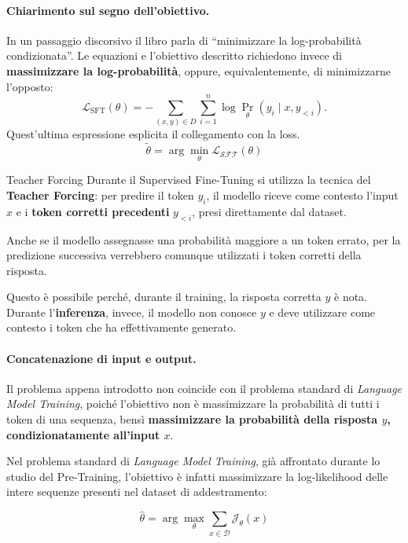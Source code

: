 \medskip




\paragraph{Chiarimento sul segno dell'obiettivo.}
In un passaggio discorsivo il libro parla di
``minimizzare la log-probabilità condizionata''.
Le equazioni e l'obiettivo descritto richiedono invece di
\textbf{massimizzare la log-probabilità}, oppure,
equivalentemente, di minimizzarne l'opposto:
\[
\mathcal{L}_{\mathrm{SFT}}(\theta)
=
-\sum_{(x,y)\in D}
\sum_{i=1}^{n}
\log \Pr_{\theta}(y_i\mid x,y_{<i}).
\]
Quest'ultima espressione esplicita il collegamento con la loss.
\[
\boxed{\tilde{\theta}=\arg\min_\theta\mathcal{L_{SFT}}(\theta)}
\]
\begin{observation}{Teacher Forcing}
Durante il Supervised Fine-Tuning si utilizza la tecnica del
\textbf{Teacher Forcing}: per predire il token $y_i$, il modello
riceve come contesto l'input $x$ e i \textbf{token corretti
precedenti} $y_{<i}$, presi direttamente dal dataset.

Anche se il modello assegnasse una probabilità maggiore a un
token errato, per la predizione successiva verrebbero comunque
utilizzati i token corretti della risposta.

Questo è possibile perché, durante il training, la risposta
corretta $y$ è nota. Durante l'\textbf{inferenza}, invece,
il modello non conosce $y$ e deve utilizzare come contesto
i token che ha effettivamente generato.

\end{observation}


\paragraph{Concatenazione di input e output.}

Il problema appena introdotto non coincide con il problema standard di
\textit{Language Model Training}, poiché l'obiettivo non è massimizzare
la probabilità di tutti i token di una sequenza, bensì
\textbf{massimizzare la probabilità della risposta $y$, condizionatamente
all'input $x$}.

Nel problema standard di \textit{Language Model Training}, già
affrontato durante lo studio del Pre-Training, l'obiettivo è infatti
massimizzare la log-likelihood delle intere sequenze presenti
nel dataset di addestramento:

\begin{equation*}
    \hat{\theta}
    =
    \arg\max_{\theta}
    \sum_{x \in \mathcal{D}}
    \mathcal{J}_{\theta}(x)
\end{equation*}

